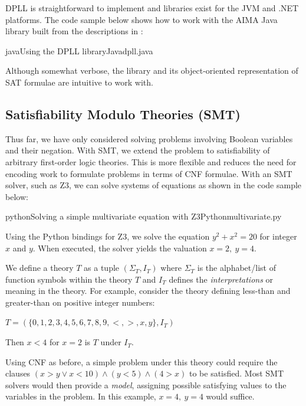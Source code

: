 \documentclass[a4paper,openany,12pt]{book}
\begin{document}
DPLL is straightforward to implement and libraries exist for the JVM and .NET platforms.
The code sample below shows how to work with the AIMA Java library built from the descriptions in
\citet{russell2016artificial}:

\begin{mycodefile}{java}{\label{code:java:aima:1}Using the DPLL library}{Java}{dpll.java}
\end{mycodefile}

Although somewhat verbose, the library and its object-oriented representation of SAT formulae are intuitive to work with.

\subsection{Satisfiability Modulo Theories (SMT)}

Thus far, we have only considered solving problems involving Boolean variables and their negation.
With SMT, we extend the problem to satisfiability of arbitrary first-order logic theories.
This is more flexible and reduces the need for encoding work to formulate problems in terms of CNF formulae.
With an SMT solver, such as Z3, we can solve systems of equations as shown in the code sample below:

\begin{mycodefile}{python}{\label{code:z3:1}Solving a simple multivariate equation with Z3}{Python}{multivariate.py}

    Using the Python bindings for Z3, we solve the equation $y^2 + x^2 = 20$ for integer $x$ and $y$.
    When executed, the solver yields the valuation $x = 2,~y = 4$.

    \vspace{0.5em}
\end{mycodefile}

We define a theory $T$ as a tuple $(\Sigma_T, I_T)$ where $\Sigma_T$ is the alphabet/list of function symbols within
the theory $T$ and $I_T$ defines the \emph{interpretations} or meaning in the theory.
For example, consider the theory defining less-than and greater-than on positive integer numbers:

\(
T = (\{0,1,2,3,4,5,6,7,8,9,<,>,x,y\}, I_T)
\)

Then $x < 4$ for $x = 2$ is $T$ under $I_T$.

Using CNF as before, a simple problem under this theory could require the clauses $(x > y \lor x < 10) \land (y < 5)
\land (4 > x)$ to be satisfied.
Most SMT solvers would then provide a \emph{model}, assigning possible satisfying values to the variables in the
problem.
In this example, $x = 4,~y=4$ would suffice.
\end{document}
